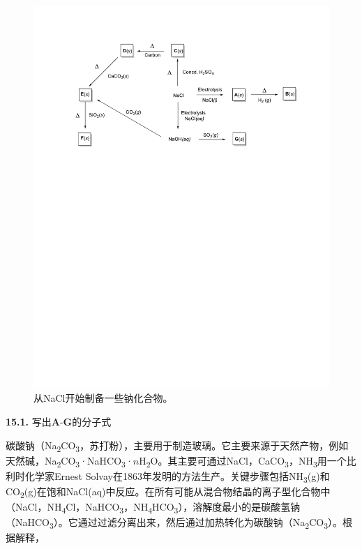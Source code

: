 \begin{figure}[h]
	\centering
	\includegraphics[width=14cm]{./pic/t15-2.pdf}
	\caption*{从NaCl开始制备一些钠化合物。}
\end{figure}

\noindent\textbf{15.1.} 写出\textbf{A}-\textbf{G}的分子式

碳酸钠（Na\textsubscript{2}CO\textsubscript{3}，苏打粉），主要用于制造玻璃。它主要来源于天然产物，例如天然碱，Na\textsubscript{2}CO\textsubscript{3}·NaHCO\textsubscript{3}·$n$H\textsubscript{2}O。其主要可通过NaCl，CaCO\textsubscript{3}，NH\textsubscript{3}用一个比利时化学家Ernest Solvay在1863年发明的方法生产。关键步骤包括NH\textsubscript{3}(g)和CO\textsubscript{2}(g)在饱和NaCl(aq)中反应。在所有可能从混合物结晶的离子型化合物中（NaCl，NH\textsubscript{4}Cl，NaHCO\textsubscript{3}，NH\textsubscript{4}HCO\textsubscript{3}），溶解度最小的是碳酸氢钠（NaHCO\textsubscript{3}）。它通过过滤分离出来，然后通过加热转化为碳酸钠（Na\textsubscript{2}CO\textsubscript{3}）。根据解释，

